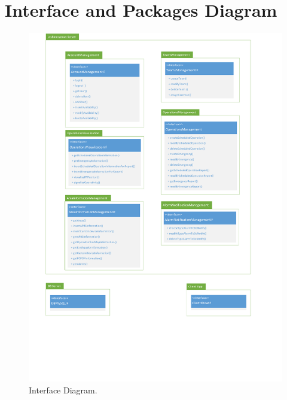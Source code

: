 \section{Interface and Packages Diagram}
\begin{figure}[h!]
	\centering
	\includegraphics[width=0.8\linewidth]{./Iterazione 1/OtherFiles/UML - Interface diagram}
	\caption{Interface Diagram.}
	\label{fig:InterfaceDiagram}
\end{figure}